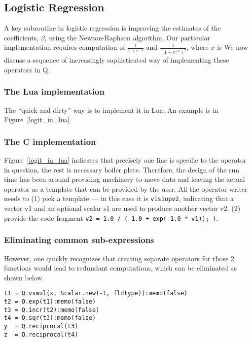 \subsection{Logistic Regression}

A key subroutine in logistic regression \cite{Hastie2009} is improving the 
estimates of the
coefficients, \(\beta\), using the Newton-Raphson algorithm.
Our particular implementation requires computation of 
\(\frac{1}{1 + e^{-x}}\) and 
\(\frac{1}{(1 + e^{-x})^2}\), where \(x\) is \TBC 
We now discuss a sequence of increasingly sophisticated way of implementing
these operators in Q.

\subsubsection{The Lua implementation}
The ``quick and dirty'' way is to implement it in Lua. An example is 
in Figure~\ref{logit_in_lua}.
\begin{figure}
\centering
{}
\end{figure}

\subsubsection{The C implementation}
Figure~\ref{logit_in_lua} indicates that precisely one line is specific to the
operator in question, the rest is necessary boiler plate. Therefore, the design
of the run time has been around providing machinery to move data and leaving
the actual operator as a template that can be provided by the user. All the operator
writer needs to (1) pick a template --- in this case it is {\tt v1s1opv2}, indicating that a
vector v1 and an optional scalar s1 are used to produce another vector v2.
(2) provide the code fragment {\tt  v2 = 1.0 / ( 1.0 + exp(-1.0 * v1)); )}.

\subsubsection{Eliminating common sub-expressions}
However, one quickly recognizes that creating separate operators for those 2
functions would lead to 
redundant computations, which can be eliminated as shown below.
\begin{verbatim}
t1 = Q.vsmul(x, Scalar.new(-1, fldtype)):memo(false)
t2 = Q.exp(t1):memo(false)
t3 = Q.incr(t2):memo(false)
t4 = Q.sqr(t3):memo(false)
y  = Q.reciprocal(t3)
z  = Q.reciprocal(t4)
\end{verbatim}

